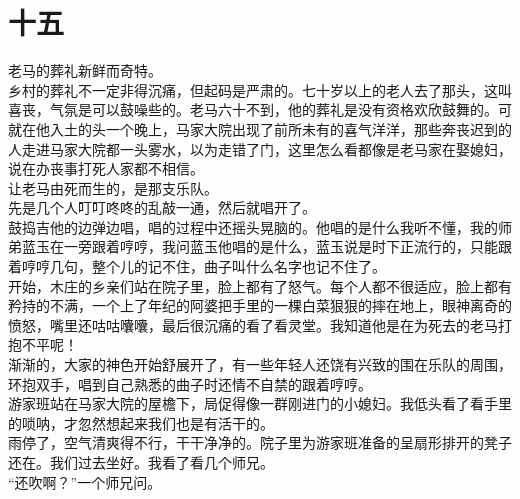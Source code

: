 \fancyhead[RO]{\thepage} %
\fancyhead[LE]{\thepage} %
\fancyfoot[LE,RO]{}
\fancyfoot[LO,CE]{}
\fancyfoot[CO,RE]{}
\chapter*{十五}
老马的葬礼新鲜而奇特。\\

乡村的葬礼不一定非得沉痛，但起码是严肃的。七十岁以上的老人去了那头，这叫喜丧，气氛是可以鼓噪些的。老马六十不到，他的葬礼是没有资格欢欣鼓舞的。可就在他入土的头一个晚上，马家大院出现了前所未有的喜气洋洋，那些奔丧迟到的人走进马家大院都一头雾水，以为走错了门，这里怎么看都像是老马家在娶媳妇，说在办丧事打死人家都不相信。\\

让老马由死而生的，是那支乐队。\\

先是几个人叮叮咚咚的乱敲一通，然后就唱开了。\\

鼓捣吉他的边弹边唱，唱的过程中还摇头晃脑的。他唱的是什么我听不懂，我的师弟蓝玉在一旁跟着哼哼，我问蓝玉他唱的是什么，蓝玉说是时下正流行的，只能跟着哼哼几句，整个儿的记不住，曲子叫什么名字也记不住了。\\

开始，木庄的乡亲们站在院子里，脸上都有了怒气。每个人都不很适应，脸上都有矜持的不满，一个上了年纪的阿婆把手里的一棵白菜狠狠的摔在地上，眼神离奇的愤怒，嘴里还咕咕囔囔，最后很沉痛的看了看灵堂。我知道他是在为死去的老马打抱不平呢！\\

渐渐的，大家的神色开始舒展开了，有一些年轻人还饶有兴致的围在乐队的周围，环抱双手，唱到自己熟悉的曲子时还情不自禁的跟着哼哼。\\

游家班站在马家大院的屋檐下，局促得像一群刚进门的小媳妇。我低头看了看手里的唢呐，才忽然想起来我们也是有活干的。\\

雨停了，空气清爽得不行，干干净净的。院子里为游家班准备的呈扇形排开的凳子还在。我们过去坐好。我看了看几个师兄。\\

“还吹啊？”一个师兄问。\\

